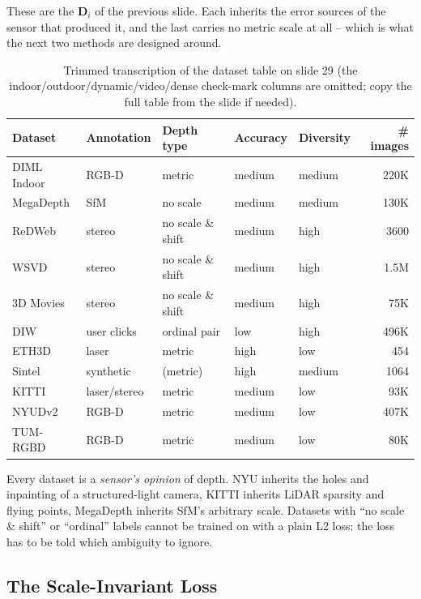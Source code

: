 \documentclass[11pt,a4paper]{article}
\theoremstyle{definition}
\theoremstyle{plain}
\theoremstyle{remark}
\begin{document}
These are the $\bm D_i$ of the previous slide. Each inherits the error sources of the sensor that produced it, and the last carries no metric scale at all -- which is what the next two methods are designed around.
 
\begin{table}[htbp]
\centering\footnotesize
\begin{tabular}{lllllr}
\toprule
Dataset & Annotation & Depth type & Accuracy & Diversity & \# images\\
\midrule
DIML Indoor & RGB-D & metric & medium & medium & 220K\\
MegaDepth & SfM & no scale & medium & medium & 130K\\
ReDWeb & stereo & no scale \& shift & medium & high & 3600\\
WSVD & stereo & no scale \& shift & medium & high & 1.5M\\
3D Movies & stereo & no scale \& shift & medium & high & 75K\\
DIW & user clicks & ordinal pair & low & high & 496K\\
ETH3D & laser & metric & high & low & 454\\
Sintel & synthetic & (metric) & high & medium & 1064\\
KITTI & laser/stereo & metric & medium & low & 93K\\
NYUDv2 & RGB-D & metric & medium & low & 407K\\
TUM-RGBD & RGB-D & metric & medium & low & 80K\\
\bottomrule
\end{tabular}
\caption{Trimmed transcription of the dataset table on slide 29 (the indoor/outdoor/dynamic/video/dense check-mark columns are omitted; copy the full table from the slide if needed).}
\end{table}
 
\begin{intuition}
Every dataset is a \emph{sensor's opinion} of depth. NYU inherits the holes and inpainting of a structured-light camera, KITTI inherits LiDAR sparsity and flying points, MegaDepth inherits SfM's arbitrary scale. Datasets with ``no scale \& shift'' or ``ordinal'' labels cannot be trained on with a plain L2 loss: the loss has to be told which ambiguity to ignore.
\end{intuition}
 
\subsection{The Scale-Invariant Loss }
 
\end{document}
